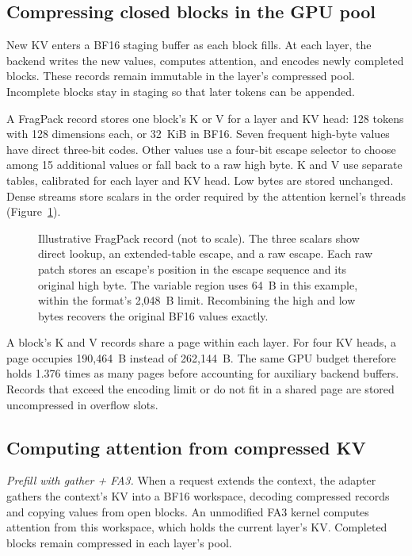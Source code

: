 \documentclass[conference]{IEEEtran}
\begin{document}
\subsection{Compressing closed blocks in the GPU pool}
New KV enters a BF16 staging buffer as each block fills. At each
layer, the backend writes the new values, computes attention, and encodes
newly completed blocks. These records remain immutable in the
layer's compressed pool. Incomplete blocks stay in staging so that later
tokens can be appended.

A FragPack record stores one block's K or V for a layer and KV head:
128 tokens with 128 dimensions each, or 32~KiB in BF16. Seven frequent
high-byte values have direct three-bit codes. Other values use a four-bit
escape selector to choose among 15 additional values or fall back to a raw
high byte. K and V use separate tables, calibrated for each layer and KV
head. Low bytes are stored unchanged. Dense streams store scalars in the
order required by the attention kernel's threads
(Figure~\ref{fig:record}).

\begin{figure}[t]
\centering

\caption{Illustrative FragPack record (not to scale). The three scalars
show direct lookup, an extended-table
escape, and a raw escape. Each raw patch stores an escape's position in
the escape sequence and its original high byte. The variable region uses
64~B in this example, within the format's 2,048~B limit. Recombining the
high and low bytes recovers the original BF16 values exactly.}
\label{fig:record}
\end{figure}

A block's K and V records share a page within each layer. For four KV heads,
a page occupies 190,464~B instead of 262,144~B. The same GPU budget therefore
holds 1.376 times as many pages before accounting for auxiliary backend
buffers. Records that exceed the encoding limit or do not fit in a shared
page are stored uncompressed in overflow slots.

\begin{samepage}
\subsection{Computing attention from compressed KV}
\emph{Prefill with gather + FA3.} When a request extends the context, the
adapter gathers the context's KV into a BF16 workspace, decoding compressed
records and copying values from open blocks. An unmodified FA3 kernel
computes attention from this workspace, which holds the current layer's KV.
Completed blocks remain compressed in each layer's pool.

\end{samepage}
\end{document}
